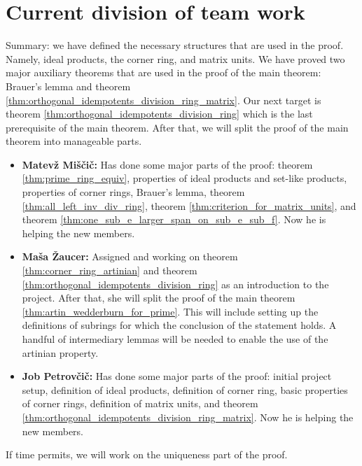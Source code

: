 %

\section{Current division of team work}

Summary: we have defined the necessary structures that are used in the proof. Namely, ideal products, the corner ring, and matrix units. We have proved two major auxiliary theorems that are used in the proof of the main theorem: Brauer's lemma and theorem \ref{thm:orthogonal_idempotents_division_ring_matrix}. Our next target is theorem \ref{thm:orthogonal_idempotents_division_ring} which is the last prerequisite of the main theorem. After that, we will split the proof of the main theorem into manageable parts.

\begin{itemize}
  \item \textbf{Matevž Miščič: } Has done some major parts of the proof: theorem \ref{thm:prime_ring_equiv}, properties of ideal products and set-like products, properties of corner rings, Brauer's lemma, theorem \ref{thm:all_left_inv_div_ring}, theorem \ref{thm:criterion_for_matrix_units}, and theorem \ref{thm:one_sub_e_larger_span_on_sub_e_sub_f}. Now he is helping the new members.
  \item \textbf{Maša Žaucer: } Assigned and working on theorem \ref{thm:corner_ring_artinian} and theorem \ref{thm:orthogonal_idempotents_division_ring} as an introduction to the project. After that, she will split the proof of the main theorem \ref{thm:artin_wedderburn_for_prime}. This will include setting up the definitions of subrings for which the conclusion of the statement holds. A handful of intermediary lemmas will be needed to enable the use of the artinian property.
  \item \textbf{Job Petrovčič: } Has done some major parts of the proof: initial project setup, definition of ideal products, definition of corner ring, basic properties of corner rings, definition of matrix units, and theorem \ref{thm:orthogonal_idempotents_division_ring_matrix}. Now he is helping the new members.
\end{itemize}
If time permits, we will work on the uniqueness part of the proof.

